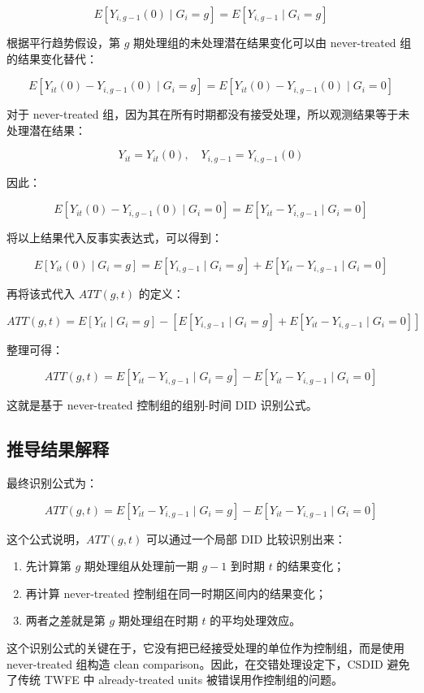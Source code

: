 \documentclass[
  fontset=windows]{ctexart}
\providecommand{\tightlist}{%
  \setlength{\itemsep}{0pt}\setlength{\parskip}{0pt}}
\begin{document}
\[
E[Y_{i,g-1}(0)\mid G_i=g]
=
E[Y_{i,g-1}\mid G_i=g]
\]

根据平行趋势假设，第 \(g\) 期处理组的未处理潜在结果变化可以由
never-treated 组的结果变化替代：

\[
E[Y_{it}(0)-Y_{i,g-1}(0)\mid G_i=g]
=
E[Y_{it}(0)-Y_{i,g-1}(0)\mid G_i=0]
\]

对于 never-treated
组，因为其在所有时期都没有接受处理，所以观测结果等于未处理潜在结果：

\[
Y_{it}=Y_{it}(0),\quad Y_{i,g-1}=Y_{i,g-1}(0)
\]

因此：

\[
E[Y_{it}(0)-Y_{i,g-1}(0)\mid G_i=0]
=
E[Y_{it}-Y_{i,g-1}\mid G_i=0]
\]

将以上结果代入反事实表达式，可以得到：

\[
E[Y_{it}(0)\mid G_i=g]
=
E[Y_{i,g-1}\mid G_i=g]
+
E[Y_{it}-Y_{i,g-1}\mid G_i=0]
\]

再将该式代入 \(ATT(g,t)\) 的定义：

\[
ATT(g,t)
=
E[Y_{it}\mid G_i=g]
-
\left[
E[Y_{i,g-1}\mid G_i=g]
+
E[Y_{it}-Y_{i,g-1}\mid G_i=0]
\right]
\]

整理可得：

\[
ATT(g,t)
=
E[Y_{it}-Y_{i,g-1}\mid G_i=g]
-
E[Y_{it}-Y_{i,g-1}\mid G_i=0]
\]

这就是基于 never-treated 控制组的组别-时间 DID 识别公式。

\subsection{推导结果解释}\label{ux63a8ux5bfcux7ed3ux679cux89e3ux91ca}

最终识别公式为：

\[
ATT(g,t)
=
E[Y_{it}-Y_{i,g-1}\mid G_i=g]
-
E[Y_{it}-Y_{i,g-1}\mid G_i=0]
\]

这个公式说明，\(ATT(g,t)\) 可以通过一个局部 DID 比较识别出来：

\begin{enumerate}
\def\labelenumi{\arabic{enumi}.}
\tightlist
\item
  先计算第 \(g\) 期处理组从处理前一期 \(g-1\) 到时期 \(t\) 的结果变化；
\item
  再计算 never-treated 控制组在同一时期区间内的结果变化；
\item
  两者之差就是第 \(g\) 期处理组在时期 \(t\) 的平均处理效应。
\end{enumerate}

这个识别公式的关键在于，它没有把已经接受处理的单位作为控制组，而是使用
never-treated 组构造 clean comparison。因此，在交错处理设定下，CSDID
避免了传统 TWFE 中 already-treated units 被错误用作控制组的问题。
\end{document}
